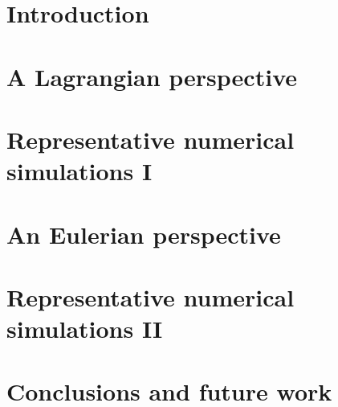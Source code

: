 \documentclass[11pt,leqno,final]{report}
\begin{document}


\startthechapters
\chapter{Introduction}
\label{introduction}

\chapter{A Lagrangian perspective}
\label{lagrangian-perspective} 

\chapter{Representative numerical simulations I}
\label{numerical-simulations-1}

\chapter{An Eulerian perspective}
\label{eulerian-perspective}

\chapter{Representative numerical simulations II}
\label{numerical-simulations-2}

\chapter{Conclusions and future work}
\label{conclusions}



\end{document}
